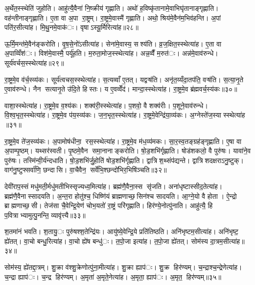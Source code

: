 अ॒र्थेत॒स्स्थेति॑ जुहोति। आहु॑त्यै॒वैना॑ नि॒ष्क्रीय॑ गृह्णाति। अथो॑ ह॒विष्कृ॑तानामे॒वाभिघृ॑तानाङ्गृह्णाति। वह॑न्तीनाङ्गृह्णाति। ए॒ता वा अ॒पा रा॒ष्ट्रम्। रा॒ष्ट्रमे॒वास्मै॑ गृह्णाति। अथो॒ श्रिय॑मे॒वैन॑म॒भिव॑हन्ति। अ॒पां पति॑र॒सीत्या॑ह। मि॒थु॒नमे॒वाक॑ः। वृषाऽस्यू॒र्मिरित्या॑ह॥२८॥

ऊ॒र्मि॒मन्त॑मे॒वैन॑ङ्करोति। वृ॒ष॒से॒नो॑ऽसीत्या॑ह। सेना॑मे॒वास्य॒ सश्य॑ति। व्र॒ज॒क्षित॒स्स्थेत्या॑ह। ए॒ता वा अ॒पाव्विँश॑ः। विश॑मे॒वास्मै॒ पर्यू॑हति। म॒रुता॒मोज॒स्स्थेत्या॑ह। अन्न॒व्वैँ म॒रुत॑ः। अन्न॑मे॒वाव॑रुन्धे। सूर्य॑वर्चस॒स्स्थेत्या॑ह॥२९॥

रा॒ष्ट्रमे॒व व॑र्च॒स्व्य॑कः। सूर्य॑त्वचस॒स्स्थेत्या॑ह। स॒त्यव्वाँ ए॒तत्। यद्वऱ्ष॑ति। अनृ॑त॒य्यँदा॒तप॑ति॒ वऱ्ष॑ति। स॒त्या॒नृ॒ते ए॒वाव॑रुन्धे। नैन सत्यानृ॒ते उ॑दि॒ते हिस्तः। य ए॒वव्वेँद॑। मान्दा॒स्स्थेत्या॑ह। रा॒ष्ट्रमे॒व ब्र॑ह्मवर्च॒स्य॑कः॥३०॥

वाशा॒स्स्थेत्या॑ह। रा॒ष्ट्रमे॒व व॒श्य॑कः। शक्व॑री॒स्स्थेत्या॑ह। प॒शवो॒ वै शक्व॑रीः। प॒शूने॒वाव॑रुन्धे। वि॒श्व॒भृत॒स्स्थेत्या॑ह। रा॒ष्ट्रमे॒व प॑य॒स्व्य॑कः। ज॒न॒भृत॒स्स्थेत्या॑ह। रा॒ष्ट्रमे॒वेन्द्रि॑या॒व्य॑कः। अ॒ग्नेस्ते॑ज॒स्यास्स्थेत्या॑ह ॥३१॥

रा॒ष्ट्रमे॒व ते॑ज॒स्व्य॑कः। अ॒पामोष॑धीना॒ रस॒स्स्थेत्या॑ह। रा॒ष्ट्रमे॒व म॑ध॒व्य॑मकः। सा॒र॒स्व॒तङ्ग्रह॑ङ्गृह्णाति। ए॒षा वा अ॒पाम्पृ॒ष्ठम्। यथ्सर॑स्वती। पृ॒ष्ठमे॒वैन समा॒नानाङ्करोति। षो॒ड॒शभि॑र्गृह्णाति। षोड॑शकलो॒ वै पुरु॑षः। यावा॑ने॒व पुरु॑षः। तस्मि॑न्वी॒र्य॑न्दधाति। षो॒ड॒शभि॑र्जु॒होति॑ षोड॒शभि॑र्गृह्णाति। द्वात्रिश॒थ्संप॑द्यन्ते। द्वात्रिशदक्षराऽनु॒ष्टुक्। वाग॑नु॒ष्टुफ्सर्वा॑णि॒ छन्दासि। वा॒चैवैन॒ सर्वे॑भि॒श्छन्दो॑भिर॒भिषि॑ञ्चति॥३२॥


देवी॑राप॒स्सं मधु॑मती॒र्मधु॑मतीभिस्सृज्यध्व॒मित्या॑ह। ब्रह्म॑णै॒वैना॒स्स सृ॑जति। अना॑धृष्टास्सीद॒तेत्या॑ह। ब्रह्म॑णै॒वैनास्सादयति। अ॒न्त॒रा होतु॑श्च॒ धिष्णि॑यं ब्राह्मणाच्छ॒सिन॑श्च सादयति। आ॒ग्ने॒यो वै होता। ऐ॒न्द्रो ब्राह्मणाच्छ॒सी। तेज॑सा चै॒वेन्द्रि॒येण॑ चोभ॒यतो॑ रा॒ष्ट्रं परि॑गृह्णाति। हिर॑ण्ये॒नोत्पु॑नाति। आहु॑त्यै॒ हि प॒वित्राभ्यामुत्पु॒नन्ति॒ व्यावृ॑त्त्यै॥३३॥

श॒तमा॑नं भवति। श॒तायु॒ः पुरु॑षश्श॒तेन्द्रि॑यः। आयु॑ष्ये॒वेन्द्रि॒ये प्रति॑तिष्ठति। अनि॑भृष्टम॒सीत्या॑ह। अनि॑भृष्ट॒ ह्ये॑तत्। वा॒चो बन्धु॒रित्या॑ह। वा॒चो ह्ये॑ष बन्धु॑ः। त॒पो॒जा इत्या॑ह। त॒पो॒जा ह्ये॑तत्। सोम॑स्य दा॒त्रम॒सीत्या॑ह॥३४॥

सोम॑स्य॒ ह्ये॑तद्दा॒त्रम्। शु॒क्रा व॑श्शु॒क्रेणोत्पु॑ना॒मीत्या॑ह। शु॒क्रा ह्याप॑ः। शु॒क्र हिर॑ण्यम्। च॒न्द्राश्च॒न्द्रेणेत्या॑ह। च॒न्द्रा ह्याप॑ः। च॒न्द्र हिर॑ण्यम्। अ॒मृता॑ अ॒मृते॒नेत्या॑ह। अ॒मृता॒ ह्याप॑ः। अ॒मृत॒ हिर॑ण्यम्॥३५॥


